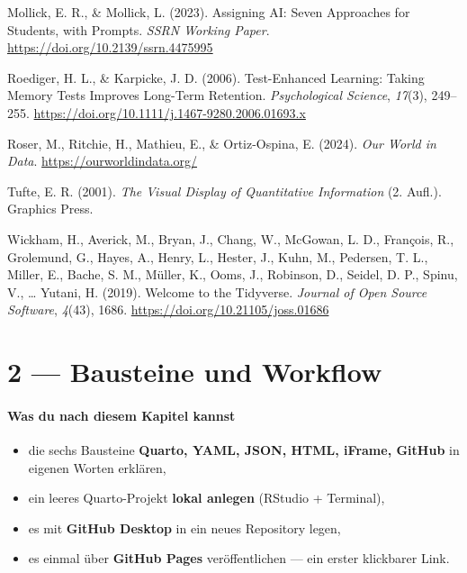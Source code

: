 \documentclass[
  ngerman,
  a4paper,
  DIV=11]{scrreprt}
\newlength{\cslhangindent}
\newenvironment{CSLReferences}[2] %
 {\begin{list}{}{%
  \setlength{\itemindent}{0pt}
  \setlength{\leftmargin}{0pt}
  \setlength{\parsep}{0pt}
  \ifodd #1
   \setlength{\leftmargin}{\cslhangindent}
   \setlength{\itemindent}{-1\cslhangindent}
  \fi
  \setlength{\itemsep}{#2\baselineskip}}}
 {\end{list}}
\providecommand{\tightlist}{%
  \setlength{\itemsep}{0pt}\setlength{\parskip}{0pt}}
\begin{document}
\begin{CSLReferences}{1}{0}
Mollick, E. R., \& Mollick, L. (2023). Assigning {AI}: Seven Approaches
for Students, with Prompts. \emph{SSRN Working Paper}.
\url{https://doi.org/10.2139/ssrn.4475995}

Roediger, H. L., \& Karpicke, J. D. (2006). Test-Enhanced Learning:
Taking Memory Tests Improves Long-Term Retention. \emph{Psychological
Science}, \emph{17}(3), 249--255.
\url{https://doi.org/10.1111/j.1467-9280.2006.01693.x}

Roser, M., Ritchie, H., Mathieu, E., \& Ortiz-Ospina, E. (2024).
\emph{Our World in Data}. \url{https://ourworldindata.org/}

Tufte, E. R. (2001). \emph{The Visual Display of Quantitative
Information} (2. Aufl.). Graphics Press.

Wickham, H., Averick, M., Bryan, J., Chang, W., McGowan, L. D.,
François, R., Grolemund, G., Hayes, A., Henry, L., Hester, J., Kuhn, M.,
Pedersen, T. L., Miller, E., Bache, S. M., Müller, K., Ooms, J.,
Robinson, D., Seidel, D. P., Spinu, V., \ldots{} Yutani, H. (2019).
Welcome to the Tidyverse. \emph{Journal of Open Source Software},
\emph{4}(43), 1686. \url{https://doi.org/10.21105/joss.01686}

\end{CSLReferences}

\chapter{2 --- Bausteine und Workflow}\label{bausteine-und-workflow}

\subsubsection{Was du nach diesem Kapitel
kannst}\label{was-du-nach-diesem-kapitel-kannst-1}

\begin{itemize}
\tightlist
\item
  die sechs Bausteine \textbf{Quarto, YAML, JSON, HTML, iFrame, GitHub}
  in eigenen Worten erklären,
\item
  ein leeres Quarto-Projekt \textbf{lokal anlegen} (RStudio + Terminal),
\item
  es mit \textbf{GitHub Desktop} in ein neues Repository legen,
\item
  es einmal über \textbf{GitHub Pages} veröffentlichen --- ein erster
  klickbarer Link.
\end{itemize}
\end{document}
